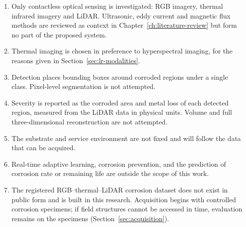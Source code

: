 \begin{enumerate}[label=\arabic*),leftmargin=*,itemsep=5pt]
  \item Only contactless optical sensing is investigated: RGB imagery, thermal
        infrared imagery and LiDAR. Ultrasonic, eddy current and magnetic flux
        methods are reviewed as context in Chapter~\ref{ch:literature-review}
        but form no part of the proposed system.
  \item Thermal imaging is chosen in preference to hyperspectral imaging, for
        the reasons given in Section~\ref{sec:lr-modalities}.
  \item Detection places bounding boxes around corroded regions under a single
        class. Pixel-level segmentation is not attempted.
  \item Severity is reported as the corroded area and metal loss of each
        detected region, measured from the LiDAR data in physical units.
        Volume and full three-dimensional reconstruction are not attempted.
  \item The substrate and service environment are not fixed and will follow
        the data that can be acquired.
  \item Real-time adaptive learning, corrosion prevention, and the prediction
        of corrosion rate or remaining life are outside the scope of this work.
  \item The registered RGB--thermal--LiDAR corrosion dataset does not exist in
        public form and is built in this research. Acquisition begins with
        controlled corrosion specimens; if field structures cannot be accessed
        in time, evaluation remains on the specimens
        (Section~\ref{sec:acquisition}).
\end{enumerate}
